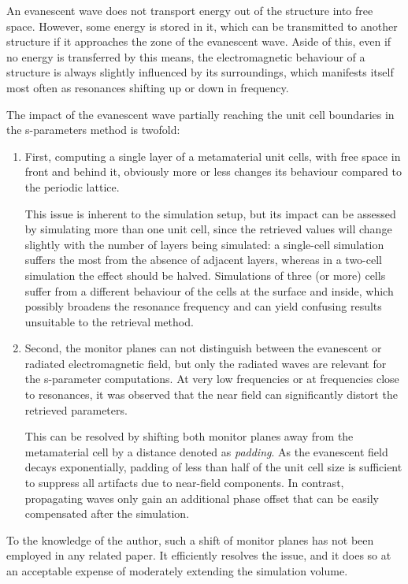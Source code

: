 An evanescent wave does not transport energy out of the structure into free space. However, some energy is stored in it, which can be transmitted to another structure if it approaches the zone of the evanescent wave. Aside of this, even if no energy is transferred by this means, the electromagnetic behaviour of a structure is always slightly influenced by its surroundings, which manifests itself most often as resonances shifting up or down in frequency.

The impact of the evanescent wave partially reaching the unit cell boundaries in the s-parameters method is twofold:
\begin{enumerate}
 \item{First, computing a single layer of a metamaterial unit cells, with free space in front and behind it, obviously more or less changes its behaviour compared to the periodic lattice. 

This issue is inherent to the simulation setup, but its impact can be assessed by simulating more than one unit cell, since the retrieved values will change slightly with the number of layers being simulated: a single-cell simulation suffers the most from the absence of adjacent layers, whereas in a two-cell simulation the effect should be halved. Simulations of three (or more) cells suffer from a different behaviour of the cells at the surface and inside, which possibly broadens the resonance frequency and can yield confusing results unsuitable to the retrieval method.
 } 
 \item{Second, the monitor planes can not distinguish between the evanescent or radiated electromagnetic field, but only the radiated waves are relevant for the s-parameter computations. At very low frequencies or at frequencies close to resonances, it was observed that the near field can significantly distort the retrieved parameters.

This can be resolved by shifting both monitor planes away from the metamaterial cell by a distance denoted as \textit{padding}. As the evanescent field decays exponentially, padding of less than half of the unit cell size is sufficient to suppress all artifacts due to near-field components. In contrast, propagating waves only gain an additional phase offset that can be easily compensated after the simulation. } 
 \end{enumerate}
To the knowledge of the author, such a shift of monitor planes has not been employed in any related paper. It efficiently resolves the issue, and it does so at an acceptable expense of moderately extending the simulation volume. %

